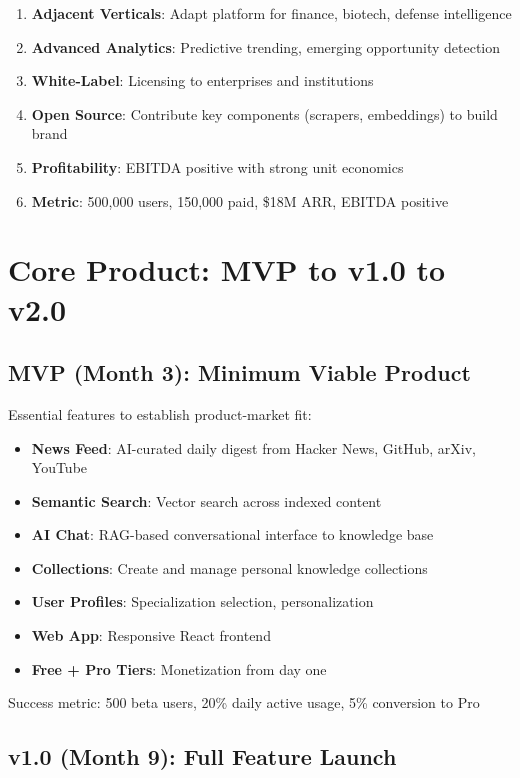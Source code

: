 \documentclass{report}
\begin{document}
\begin{enumerate}
    \item \textbf{Adjacent Verticals}: Adapt platform for finance, biotech, defense intelligence
    \item \textbf{Advanced Analytics}: Predictive trending, emerging opportunity detection
    \item \textbf{White-Label}: Licensing to enterprises and institutions
    \item \textbf{Open Source}: Contribute key components (scrapers, embeddings) to build brand
    \item \textbf{Profitability}: EBITDA positive with strong unit economics
    \item \textbf{Metric}: 500,000 users, 150,000 paid, \$18M ARR, EBITDA positive
\end{enumerate}

\section{Core Product: MVP to v1.0 to v2.0}

\subsection{MVP (Month 3): Minimum Viable Product}

Essential features to establish product-market fit:

\begin{itemize}
    \item \textbf{News Feed}: AI-curated daily digest from Hacker News, GitHub, arXiv, YouTube
    \item \textbf{Semantic Search}: Vector search across indexed content
    \item \textbf{AI Chat}: RAG-based conversational interface to knowledge base
    \item \textbf{Collections}: Create and manage personal knowledge collections
    \item \textbf{User Profiles}: Specialization selection, personalization
    \item \textbf{Web App}: Responsive React frontend
    \item \textbf{Free + Pro Tiers}: Monetization from day one
\end{itemize}

Success metric: 500 beta users, 20\% daily active usage, 5\% conversion to Pro

\subsection{v1.0 (Month 9): Full Feature Launch}
\end{document}
